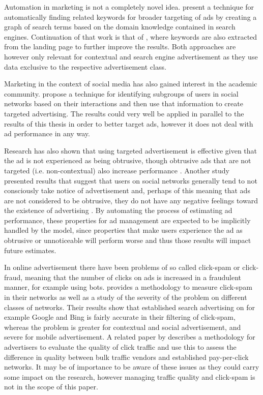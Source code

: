 \documentclass{sig-alternate}
\begin{document}
Automation in marketing is not a completely novel idea. \cite{Joshi2006} present a technique for automatically finding related keywords for broader targeting of ads by creating a graph of search terms based on the domain knowledge contained in search engines. Continuation of that work is that of \cite{Thomaidou2011}, where keywords are also extracted from the landing page to further improve the results. Both approaches are however only relevant for contextual and search engine advertisement as they use data exclusive to the respective advertisement class.

Marketing in the context of social media has also gained interest in the academic community. \cite{Yang2006} propose a technique for identifying subgroups of users in social networks based on their interactions and then use that information to create targeted advertising. The results could very well be applied in parallel to the results of this thesis in order to better target ads, however it does not deal with ad performance in any way.

Research has also shown that using targeted advertisement is effective given that the ad is not experienced as being obtrusive, though obtrusive ads that are not targeted (i.e. non-contextual) also increase performance \citep{Goldfarb2011}. Another study presented results that suggest that users on social networks generally tend to not consciously take notice of advertisement and, perhaps of this meaning that ads are not considered to be obtrusive, they do not have any negative feelings toward the existence of advertising \citep{Hadija2012}. By automating the process of estimating ad performance, these properties for ad management are expected to be implicitly handled by the model, since properties that make users experience the ad as obtrusive or unnoticeable will perform worse and thus those results will impact future estimates.

In online advertisement there have been problems of so called click-spam or click-fraud, meaning that the number of clicks on ads is increased in a fraudulent manner, for example using bots. \cite{Dave2012} provides a methodology to measure click-spam in their networks as well as a study of the severity of the problem on different classes of networks. Their results show that established search advertising on for example Google and Bing is fairly accurate in their filtering of click-spam, whereas the problem is greater for contextual and social advertisement, and severe for mobile advertisement. A related paper by \cite{Zhang2011} describes a methodology for advertisers to evaluate the quality of click traffic and use this to assess the difference in quality between bulk traffic vendors and established pay-per-click networks. It may be of importance to be aware of these issues as they could carry some impact on the research, however managing traffic quality and click-spam is not in the scope of this paper.
\end{document}
